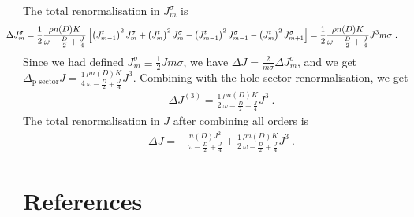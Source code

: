 \documentclass[10pt]{iopart}
\begin{document}
The total renormalisation in  \(J^\sigma_m\) is
\begin{eqnarray}
	\hspace*{-20pt}\Delta J^\sigma_m = \frac{1}{2}\frac{\rho n(D) K}{\omega - \frac{D}{2} + \frac{J}{4}}\left[\left( J^t_{m-1} \right)^2 J^\sigma_m + \left( J^t_m \right)^2 J^\sigma_m - \left( J^t_{m-1} \right)^2 J^\sigma_{m-1} - \left(J^t_m\right)^2 J^\sigma_{m+1} \right] = \frac{1}{2}\frac{\rho n(D) K}{\omega - \frac{D}{2} + \frac{J}{4}}J^3 m \sigma~.\qquad
\end{eqnarray}
Since we had defined \(J^\sigma_m \equiv \frac{1}{2}J m \sigma\), we have \(\Delta J = \frac{2}{m\sigma}\Delta J^\sigma_m\), and we get \(\Delta_\text{p sector} J = \frac{1}{4}\frac{\rho n(D) K}{\omega - \frac{D}{2} + \frac{J}{4}}J^3\).
Combining with the hole sector renormalisation, we get
\begin{eqnarray}
	\Delta J^{(3)} = \frac{1}{2}\frac{\rho n(D) K}{\omega - \frac{D}{2} + \frac{J}{4}}J^3~.
\end{eqnarray}
The total renormalisation in \(J\) after combining all orders is
\begin{eqnarray}
	\Delta J = -\frac{n(D) J^2}{\omega - \frac{D}{2} + \frac{J}{4}} + \frac{1}{2}\frac{\rho n(D) K}{\omega - \frac{D}{2} + \frac{J}{4}}J^3~.
\end{eqnarray}

\section*{References}


\end{document}
